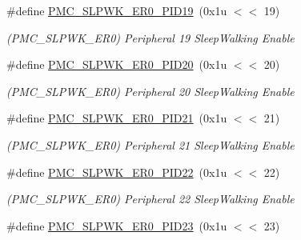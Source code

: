 \begin{DoxyCompactItemize}
\mbox{\label{group__SAMS70__PMC_gab43119eba8c2f4ab723c00849169523f}} 
\#define \mbox{\hyperlink{group__SAMS70__PMC_gab43119eba8c2f4ab723c00849169523f}{P\+M\+C\+\_\+\+S\+L\+P\+W\+K\+\_\+\+E\+R0\+\_\+\+P\+I\+D19}}~(0x1u $<$$<$ 19)
\begin{DoxyCompactList}\small\item\em (P\+M\+C\+\_\+\+S\+L\+P\+W\+K\+\_\+\+E\+R0) Peripheral 19 Sleep\+Walking Enable \end{DoxyCompactList}\item 
\mbox{\label{group__SAMS70__PMC_gab09575cb5cad6e76033ba550f6eba4cf}} 
\#define \mbox{\hyperlink{group__SAMS70__PMC_gab09575cb5cad6e76033ba550f6eba4cf}{P\+M\+C\+\_\+\+S\+L\+P\+W\+K\+\_\+\+E\+R0\+\_\+\+P\+I\+D20}}~(0x1u $<$$<$ 20)
\begin{DoxyCompactList}\small\item\em (P\+M\+C\+\_\+\+S\+L\+P\+W\+K\+\_\+\+E\+R0) Peripheral 20 Sleep\+Walking Enable \end{DoxyCompactList}\item 
\mbox{\label{group__SAMS70__PMC_ga6018bba1ff61d49b66340adeb558032c}} 
\#define \mbox{\hyperlink{group__SAMS70__PMC_ga6018bba1ff61d49b66340adeb558032c}{P\+M\+C\+\_\+\+S\+L\+P\+W\+K\+\_\+\+E\+R0\+\_\+\+P\+I\+D21}}~(0x1u $<$$<$ 21)
\begin{DoxyCompactList}\small\item\em (P\+M\+C\+\_\+\+S\+L\+P\+W\+K\+\_\+\+E\+R0) Peripheral 21 Sleep\+Walking Enable \end{DoxyCompactList}\item 
\mbox{\label{group__SAMS70__PMC_ga8ea037282e75cc5c046a45f91d309049}} 
\#define \mbox{\hyperlink{group__SAMS70__PMC_ga8ea037282e75cc5c046a45f91d309049}{P\+M\+C\+\_\+\+S\+L\+P\+W\+K\+\_\+\+E\+R0\+\_\+\+P\+I\+D22}}~(0x1u $<$$<$ 22)
\begin{DoxyCompactList}\small\item\em (P\+M\+C\+\_\+\+S\+L\+P\+W\+K\+\_\+\+E\+R0) Peripheral 22 Sleep\+Walking Enable \end{DoxyCompactList}\item 
\mbox{\label{group__SAMS70__PMC_gae947d98d4be38826f4eaeab7c87c417d}} 
\#define \mbox{\hyperlink{group__SAMS70__PMC_gae947d98d4be38826f4eaeab7c87c417d}{P\+M\+C\+\_\+\+S\+L\+P\+W\+K\+\_\+\+E\+R0\+\_\+\+P\+I\+D23}}~(0x1u $<$$<$ 23)
$$
\end{DoxyCompactItemize}
